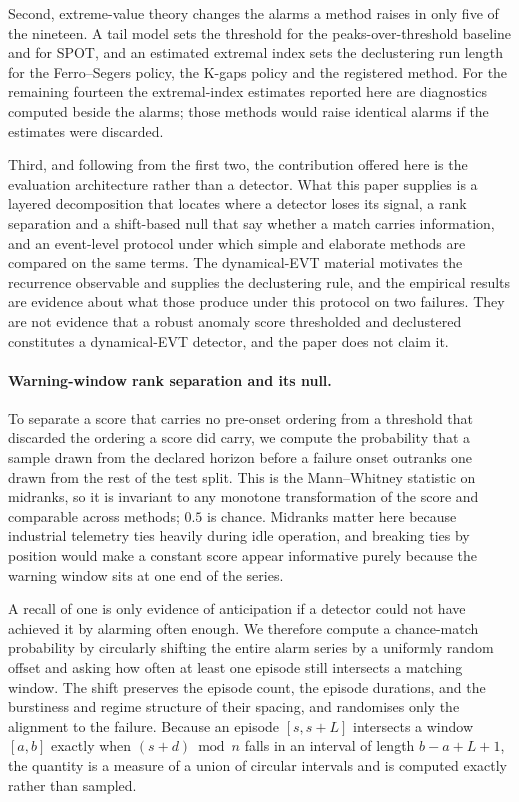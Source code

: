 Second, extreme-value theory changes the alarms a method raises in only five of the nineteen. A tail model sets the threshold for the peaks-over-threshold baseline and for SPOT, and an estimated extremal index sets the declustering run length for the Ferro--Segers policy, the K-gaps policy and the registered method. For the remaining fourteen the extremal-index estimates reported here are diagnostics computed beside the alarms; those methods would raise identical alarms if the estimates were discarded.

Third, and following from the first two, the contribution offered here is the evaluation architecture rather than a detector. What this paper supplies is a layered decomposition that locates where a detector loses its signal, a rank separation and a shift-based null that say whether a match carries information, and an event-level protocol under which simple and elaborate methods are compared on the same terms. The dynamical-EVT material motivates the recurrence observable and supplies the declustering rule, and the empirical results are evidence about what those produce under this protocol on two failures. They are not evidence that a robust anomaly score thresholded and declustered constitutes a dynamical-EVT detector, and the paper does not claim it.



\paragraph{Warning-window rank separation and its null.} To separate a score that carries no pre-onset ordering from a threshold that discarded the ordering a score did carry, we compute the probability that a sample drawn from the declared horizon before a failure onset outranks one drawn from the rest of the test split. This is the Mann--Whitney statistic on midranks, so it is invariant to any monotone transformation of the score and comparable across methods; \(0.5\) is chance. Midranks matter here because industrial telemetry ties heavily during idle operation, and breaking ties by position would make a constant score appear informative purely because the warning window sits at one end of the series.

A recall of one is only evidence of anticipation if a detector could not have achieved it by alarming often enough. We therefore compute a chance-match probability by circularly shifting the entire alarm series by a uniformly random offset and asking how often at least one episode still intersects a matching window. The shift preserves the episode count, the episode durations, and the burstiness and regime structure of their spacing, and randomises only the alignment to the failure. Because an episode \([s,s+L]\) intersects a window \([a,b]\) exactly when \((s+d)\bmod n\) falls in an interval of length \(b-a+L+1\), the quantity is a measure of a union of circular intervals and is computed exactly rather than sampled.


